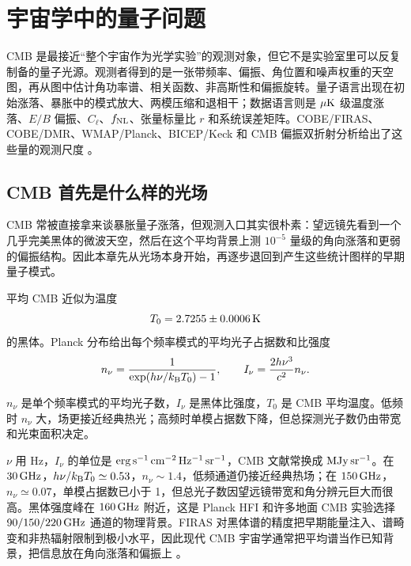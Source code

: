 \chapter{宇宙学中的量子问题}
\label{chap:16}

\begin{chapteropening}
CMB 是最接近“整个宇宙作为光学实验”的观测对象，但它不是实验室里可以反复制备的量子光源。观测者得到的是一张带频率、偏振、角位置和噪声权重的天空图，再从图中估计角功率谱、相关函数、非高斯性和偏振旋转。量子语言出现在初始涨落、暴胀中的模式放大、两模压缩和退相干；数据语言则是 \(\mu{\rm K}\) 级温度涨落、\(E/B\) 偏振、\(C_\ell\)、\(f_{\rm NL}\)、张量标量比 \(r\) 和系统误差矩阵。COBE/FIRAS、COBE/DMR、WMAP/Planck、BICEP/Keck 和 CMB 偏振双折射分析给出了这些量的观测尺度 \citep{1967PhRvL..19.1199S,1990ApJ...354L..37M,1992ApJ...396L...1S,1994ApJ...420..439M,1996ApJ...473..576F,2009ApJ...707..916F,2020A&A...641A...1P,2020A&A...641A...5P,2020A&A...641A...6P,2020A&A...641A..10P,2021PhRvL.127o1301A}。
\end{chapteropening}

\section{CMB 首先是什么样的光场}

CMB 常被直接拿来谈暴胀量子涨落，但观测入口其实很朴素：望远镜先看到一个几乎完美黑体的微波天空，然后在这个平均背景上测 \(10^{-5}\) 量级的角向涨落和更弱的偏振结构。因此本章先从光场本身开始，再逐步退回到产生这些统计图样的早期量子模式。

平均 CMB 近似为温度
\[
  T_0 = 2.7255\pm0.0006\,{\rm K}
\]
的黑体。Planck 分布给出每个频率模式的平均光子占据数和比强度
\begin{equation}
  n_\nu
  =
  \frac{1}{\exp(h\nu/k_{\rm B}T_0)-1},
  \qquad
  I_\nu
  =
  \frac{2h\nu^3}{c^2}n_\nu .
  \label{eq:ch16-planck-spectrum}
\end{equation}
\begin{formulaexplain}[公式 (16.1) 解读]
\(n_\nu\) 是单个频率模式的平均光子数，\(I_\nu\) 是黑体比强度，\(T_0\) 是 CMB 平均温度。低频时 \(n_\nu\) 大，场更接近经典热光；高频时单模占据数下降，但总探测光子数仍由带宽和光束面积决定。
\end{formulaexplain}
\(\nu\) 用 Hz，\(I_\nu\) 的单位是 \({\rm erg\,s^{-1}\,cm^{-2}\,Hz^{-1}\,sr^{-1}}\)，CMB 文献常换成 \({\rm MJy\,sr^{-1}}\)。在 \(30\,{\rm GHz}\)，\(h\nu/k_{\rm B}T_0\simeq0.53\)，\(n_\nu\sim1.4\)，低频通道仍接近经典热场；在 \(150\,{\rm GHz}\)，\(n_\nu\simeq0.07\)，单模占据数已小于 1，但总光子数因望远镜带宽和角分辨元巨大而很高。黑体强度峰在 \(160\,{\rm GHz}\) 附近，这是 Planck HFI 和许多地面 CMB 实验选择 \(90/150/220\,{\rm GHz}\) 通道的物理背景。FIRAS 对黑体谱的精度把早期能量注入、谱畸变和非热辐射限制到极小水平，因此现代 CMB 宇宙学通常把平均谱当作已知背景，把信息放在角向涨落和偏振上 \citep{1994ApJ...420..439M,1996ApJ...473..576F,2009ApJ...707..916F}。

